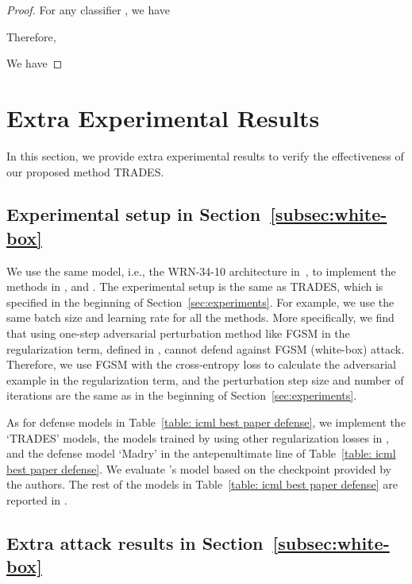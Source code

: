 \documentclass[11pt]{article}
\newcommand{\0}{\mathbf{0}}
\newcommand{\1}{\mathbf{1}}
\begin{document}
\begin{proof}
For any classifier , we have


Therefore,

We have

\end{proof}




\section{Extra Experimental Results}
In this section, we provide extra experimental results to verify the effectiveness of our proposed method TRADES.
\subsection{Experimental setup in Section~\ref{subsec:white-box}}
We use the same model, i.e., the WRN-34-10 architecture in~\cite{zagoruyko2016wide}, to implement the methods in \cite{zheng2016improving}, \cite{kurakin2016adversarial} and \cite{ross2017improving}. The experimental setup is the same as TRADES, which is specified in the beginning of Section~\ref{sec:experiments}. For example, we use the same batch size and learning rate for all the methods. More specifically, we find that using one-step adversarial perturbation method like FGSM in the regularization term, defined in \cite{kurakin2016adversarial}, cannot defend against FGSM (white-box) attack. Therefore, we use FGSM with the cross-entropy loss to calculate the adversarial example  in the regularization term, and the perturbation step size  and number of iterations  are the same as in the beginning of Section~\ref{sec:experiments}. 

As for defense models in Table~\ref{table: icml best paper defense}, we implement the `TRADES' models, the models trained by using other regularization losses in \cite{kurakin2016adversarial,ross2017improving,zheng2016improving}, and the defense model `Madry' in the antepenultimate line of Table~\ref{table: icml best paper defense}. We evaluate \cite{wong1805scaling}'s model based on the checkpoint provided by the authors. The rest of the models in Table~\ref{table: icml best paper defense} are reported in \cite{athalye2018obfuscated}.







\subsection{Extra attack results in Section~\ref{subsec:white-box}}
\end{document}
